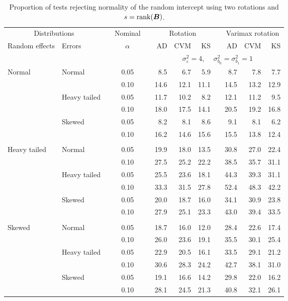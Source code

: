\begin{table}[ht]
\centering
\caption{\label{tab:fixedsimb0sB} Proportion of tests rejecting normality of the random intercept using two rotations and $s = \operatorname{rank}(\bm{B})$.}
\begin{scriptsize}
\begin{tabular}{ll p{.1cm} c p{.1cm} rrr p{.1cm} rrr}
  \hline
  \multicolumn{2}{c}{Distributions}& & Nominal & &  \multicolumn{3}{c}{Rotation} & & \multicolumn{3}{c}{Varimax rotation} \\ \cline{1-2} \cline{6-8} \cline{10-12}   
  Random effects & Errors & & $\alpha$ & & AD & CVM & KS & & AD & CVM & KS \\ 
   \hline
& && && \multicolumn{7}{c}{$\sigma_{\varepsilon}^2 = 4$, \ \ $\sigma_{b_0}^2 = \sigma_{b_1}^2 = 1$} \\ \cline{6-12}
\rowcolor{gray!20} Normal & Normal &  & 0.05 &  & 8.5 & 6.7 & 5.9 &  & 8.7 & 7.8 & 7.7 \\ 
\rowcolor{gray!20}   &  &  & 0.10 &  & 14.6 & 12.1 & 11.1 &  & 14.5 & 13.2 & 12.9 \\ 
\rowcolor{gray!20}   & Heavy tailed &  & 0.05 &  & 11.7 & 10.2 & 8.2 &  & 12.1 & 11.2 & 9.5 \\ 
\rowcolor{gray!20}   &  &  & 0.10 &  & 18.0 & 17.5 & 14.1 &  & 20.5 & 19.2 & 16.8 \\ 
\rowcolor{gray!20}   & Skewed &  & 0.05 &  & 8.2 & 8.1 & 8.6 &  & 9.1 & 8.1 & 6.2 \\ 
\rowcolor{gray!20}   &  &  & 0.10 &  & 16.2 & 14.6 & 15.6 &  & 15.5 & 13.8 & 12.4 \\ 
             &&&&&&&&&&&\\
  Heavy tailed & Normal &  & 0.05 &  & 19.9 & 18.0 & 13.5 &  & 30.8 & 27.0 & 22.4 \\ 
   &  &  & 0.10 &  & 27.5 & 25.2 & 22.2 &  & 38.5 & 35.7 & 31.1 \\ 
   & Heavy tailed &  & 0.05 &  & 25.5 & 23.6 & 18.1 &  & 44.3 & 39.3 & 31.1 \\ 
   &  &  & 0.10 &  & 33.3 & 31.5 & 27.8 &  & 52.4 & 48.3 & 42.2 \\ 
   & Skewed &  & 0.05 &  & 20.0 & 18.7 & 16.0 &  & 34.1 & 30.9 & 23.8 \\ 
   &  &  & 0.10 &  & 27.9 & 25.1 & 23.3 &  & 43.0 & 39.4 & 33.5 \\ 
             &&&&&&&&&&&\\
  Skewed & Normal &  & 0.05 &  & 18.7 & 16.0 & 12.0 &  & 28.4 & 22.6 & 17.4 \\ 
 &  &  & 0.10 &  & 26.0 & 23.6 & 19.1 &  & 35.5 & 30.1 & 25.4 \\ 
 & Heavy tailed &  & 0.05 &  & 22.9 & 20.5 & 16.1 &  & 33.5 & 29.1 & 21.2 \\ 
 &  &  & 0.10 &  & 30.6 & 28.3 & 24.2 &  & 42.7 & 38.1 & 31.0 \\ 
 & Skewed &  & 0.05 &  & 19.1 & 16.6 & 14.2 &  & 29.8 & 22.0 & 16.2 \\ 
 &  &  & 0.10 &  & 28.1 & 24.5 & 21.3 &  & 40.8 & 32.1 & 26.1 \\ 


\end{tabular}
\end{scriptsize}
\end{table}
